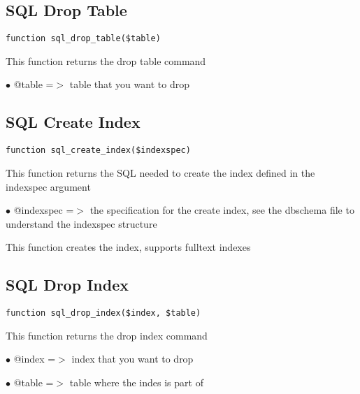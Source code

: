 \documentclass[a4paper]{book}
\begin{document}
\hypertarget{toc259}{}
\subsection{SQL Drop Table}

\begin{lstlisting}
function sql_drop_table($table)
\end{lstlisting}

This function returns the drop table command

\begin{compactitem}
\item[\color{myblue}$\bullet$] @table =$>$ table that you want to drop
\end{compactitem}

\hypertarget{toc260}{}
\subsection{SQL Create Index}

\begin{lstlisting}
function sql_create_index($indexspec)
\end{lstlisting}

This function returns the SQL needed to create the index defined in the
indexspec argument

\begin{compactitem}
\item[\color{myblue}$\bullet$] @indexspec =$>$ the specification for the create index, see the dbschema
              file to understand the indexspec structure
\end{compactitem}

This function creates the index, supports fulltext indexes

\hypertarget{toc261}{}
\subsection{SQL Drop Index}

\begin{lstlisting}
function sql_drop_index($index, $table)
\end{lstlisting}

This function returns the drop index command

\begin{compactitem}
\item[\color{myblue}$\bullet$] @index =$>$ index that you want to drop
\item[\color{myblue}$\bullet$] @table =$>$ table where the indes is part of
\end{compactitem}
\end{document}
